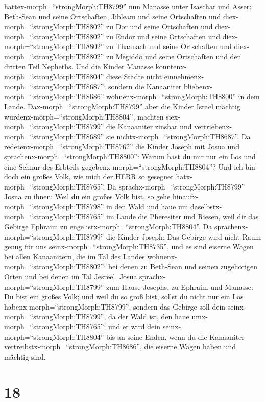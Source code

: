 hattex-morph=``strongMorph:TH8799'' nun Manasse unter Isaschar und
Asser: Beth-Sean und seine Ortschaften, Jibleam und seine Ortschaften
und diex-morph=``strongMorph:TH8802'' zu Dor und seine Ortschaften und
diex-morph=``strongMorph:TH8802'' zu Endor und seine Ortschaften und
diex-morph=``strongMorph:TH8802'' zu Thaanach und seine Ortschaften und
diex-morph=``strongMorph:TH8802'' zu Megiddo und seine Ortschaften und
den dritten Teil Nepheths.  Und die Kinder Manasse
konntenx-morph=``strongMorph:TH8804'' diese Städte nicht
einnehmenx-morph=``strongMorph:TH8687''; sondern die Kanaaniter
bliebenx-morph=``strongMorph:TH8686''
wohnenx-morph=``strongMorph:TH8800'' in dem Lande. 
Dax-morph=``strongMorph:TH8799'' aber die Kinder Israel mächtig
wurdenx-morph=``strongMorph:TH8804'', machten
siex-morph=``strongMorph:TH8799'' die Kanaaniter zinsbar und
vertriebenx-morph=``strongMorph:TH8689'' sie
nichtx-morph=``strongMorph:TH8687''.  Da
redetenx-morph=``strongMorph:TH8762'' die Kinder Joseph mit Josua und
sprachenx-morph=``strongMorph:TH8800'': Warum hast du mir nur ein Los
und eine Schnur des Erbteils gegebenx-morph=``strongMorph:TH8804''? Und
ich bin doch ein großes Volk, wie mich der HERR so gesegnet
hatx-morph=``strongMorph:TH8765''.  Da
sprachx-morph=``strongMorph:TH8799'' Josua zu ihnen: Weil du ein großes
Volk bist, so gehe hinaufx-morph=``strongMorph:TH8798'' in den Wald und
haue um daselbstx-morph=``strongMorph:TH8765'' im Lande die Pheresiter
und Riesen, weil dir das Gebirge Ephraim zu enge
istx-morph=``strongMorph:TH8804''.  Da
sprachenx-morph=``strongMorph:TH8799'' die Kinder Joseph: Das Gebirge
wird nicht Raum genug für uns seinx-morph=``strongMorph:TH8735'', und es
sind eiserne Wagen bei allen Kanaanitern, die im Tal des Landes
wohnenx-morph=``strongMorph:TH8802'': bei denen zu Beth-Sean und seinen
zugehörigen Orten und bei denen im Tal Jesreel.  Josua
sprachx-morph=``strongMorph:TH8799'' zum Hause Josephs, zu Ephraim und
Manasse: Du bist ein großes Volk; und weil du so groß bist, sollst du
nicht nur ein Los habenx-morph=``strongMorph:TH8799'', 
sondern das Gebirge soll dein seinx-morph=``strongMorph:TH8799'', da der
Wald ist, den haue umx-morph=``strongMorph:TH8765''; und er wird dein
seinx-morph=``strongMorph:TH8804'' bis an seine Enden, wenn du die
Kanaaniter vertreibstx-morph=``strongMorph:TH8686'', die eiserne Wagen
haben und mächtig sind.

\hypertarget{section-17}{%
\section{18}\label{section-17}}

